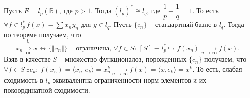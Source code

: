\begin{example}
Пусть $\displaystyle E=l_{p}(\mathbb{R})$, где $\displaystyle p >1$. Тогда $\displaystyle ( l_{p})^{*} \cong l_{q}$, где $\displaystyle \dfrac{1}{p} +\dfrac{1}{q} =1$. То есть $\displaystyle \forall f\in l_{p}^{*} \ f( x) =\sum x_{n} y_{n}$ для $\displaystyle y\in l_{q}$. Пусть $\displaystyle \{e_{n}\}$ -- стандартный базис в $\displaystyle l_{q}$. Тогда по теореме получаем, что
\begin{equation*}
x_{n}\xrightarrow[\text{сл}]{l_{p}} x\Leftrightarrow \{\Vert x_{n}\Vert \}\text{ -- ограничена} ,\ \forall f\in S:\ \overline{[ S]} =l_{p}^{*} \hookrightarrow f( x_{n})\xrightarrow[n\rightarrow \infty ]{} f( x) .
\end{equation*}
Взяв в качестве $\displaystyle S$ -- множество функционалов, порожденных $\displaystyle \{e_{n}\}$ получаем, что $\displaystyle \forall f\in S\ \exists e_{k} :\ f( x_{n}) =\langle x_{n} ,e_{k}\rangle =x_{n}^{k}\xrightarrow[n\rightarrow \infty ]{} f( x) =\langle x,e_{k}\rangle =x^{k}$. То есть, слабая сходимость в $\displaystyle l_{p}$ эквивалентна ограниченности норм элементов и их покоординатной сходимости.
\end{example}

